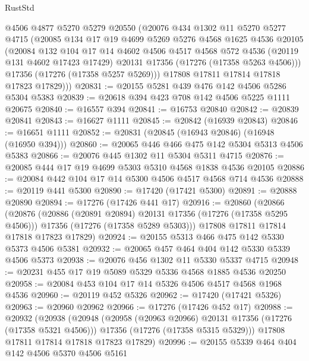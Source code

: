 \begin{lexlean}{RustStd}
\begin{coremodule}
        @4506
        @4877
        @5270
        @5279
        @20550
        (@20076
          @434
          @1302
          @11
          @5270
          @5277
          @4715
          (@20085
            @134
            @17
            @19
            @4699
            @5269
            @5276
            @4568
            @1625
            @4536
            @20105
            (@20084
              @132
              @104
              @17
              @14
              @4602
              @4506
              @4517
              @4568
              @572
              @4536
              (@20119 @131 @4602 @17423 @17429)
              @20131
              @17356
              (@17276 (@17358 @5263 @4506)))
            @17356
            (@17276 (@17358 @5257 @5269)))
          @17808
          @17811
          @17814
          @17818
          @17823
          @17829)))
@20831 := @20155 @5281 @439 @476 @142 @4506 @5286 @5304 @5383
@20839 := @20618 @394 @423 @708 @142 @4506 @5225 @1111 @20675
@20840 := @16557 @394
@20841 := @16753 @20840
@20842 := @20839 @20841
@20843 := @16627 @1111
@20845 := @20842 (@16939 @20843)
@20846 := @16651 @1111
@20852 := @20831 (@20845 (@16943 @20846) (@16948 (@16950 @394)))
@20860 := @20065 @446 @466 @475 @142 @5304 @5313 @4506 @5383
@20866 := @20076 @445 @1302 @11 @5304 @5311 @4715
@20876 := @20085 @444 @17 @19 @4699 @5303 @5310 @4568 @1838 @4536 @20105
@20886 := @20084 @442 @104 @17 @14 @5300 @4506 @4517 @4568 @714 @4536
@20888 := @20119 @441 @5300
@20890 := @17420 (@17421 @5300)
@20891 := @20888 @20890
@20894 := @17276 (@17426 @441 @17)
@20916 := @20860
    (@20866
      (@20876
        (@20886 (@20891 @20894) @20131 @17356 (@17276 (@17358 @5295 @4506)))
        @17356
        (@17276 (@17358 @5289 @5303)))
      @17808
      @17811
      @17814
      @17818
      @17823
      @17829)
@20924 := @20155 @5313 @466 @475 @142 @5330 @5373 @4506 @5381
@20932 := @20065 @457 @464 @404 @142 @5330 @5339 @4506 @5373
@20938 := @20076 @456 @1302 @11 @5330 @5337 @4715
@20948 := @20231 @455 @17 @19 @5089 @5329 @5336 @4568 @1885 @4536 @20250
@20958 := @20084 @453 @104 @17 @14 @5326 @4506 @4517 @4568 @1968 @4536
@20960 := @20119 @452 @5326
@20962 := @17420 (@17421 @5326)
@20963 := @20960 @20962
@20966 := @17276 (@17426 @452 @17)
@20988 := @20932
    (@20938
      (@20948
        (@20958 (@20963 @20966) @20131 @17356 (@17276 (@17358 @5321 @4506)))
        @17356
        (@17276 (@17358 @5315 @5329)))
      @17808
      @17811
      @17814
      @17818
      @17823
      @17829)
@20996 := @20155 @5339 @464 @404 @142 @4506 @5370 @4506 @5161

\end{coremodule}
\end{lexlean}
